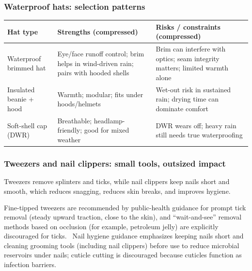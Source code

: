 \begin{frame}[t,shrink=18]
  \frametitle{Waterproof hats: selection patterns}
  \justifying
  \scriptsize
  \renewcommand{\arraystretch}{0.95}
  \setlength{\tabcolsep}{4pt}
  \begin{table}
    \centering
    \begin{tabularx}{\textwidth}{@{}lX X@{}}
      \toprule
      Hat type & Strengths (compressed) & Risks / constraints (compressed) \\
      \midrule
      Waterproof brimmed hat & Eye/face runoff control; brim helps in wind-driven rain; pairs with hooded shells & Brim can interfere with optics; seam integrity matters; limited warmth alone \\
      \addlinespace
      Insulated beanie + hood & Warmth; modular; fits under hoods/helmets & Wet-out risk in sustained rain; drying time can dominate comfort \\
      \addlinespace
      Soft-shell cap (DWR) & Breathable; headlamp-friendly; good for mixed weather & DWR wears off; heavy rain still needs true waterproofing \\
      \bottomrule
    \end{tabularx}
  \end{table}
\end{frame}


\begin{frame}[t]
  \frametitle{Tweezers and nail clippers: small tools, outsized impact}
  \justifying
  \begin{block}
    Tweezers remove splinters and ticks, while nail clippers keep nails short and smooth, which reduces snagging, reduces skin breaks, and improves hygiene.
  \end{block}

  \begin{block}
    Fine-tipped tweezers are recommended by public-health guidance for prompt tick removal (steady upward traction, close to the skin), and ``wait-and-see'' removal methods based on occlusion (for example, petroleum jelly) are explicitly discouraged for ticks.~\cite{cdc_tick_bite}
    Nail hygiene guidance emphasizes keeping nails short and cleaning grooming tools (including nail clippers) before use to reduce microbial reservoirs under nails; cuticle cutting is discouraged because cuticles function as infection barriers.~\cite{cdc_nail_hygiene}
  \end{block}
\end{frame}

